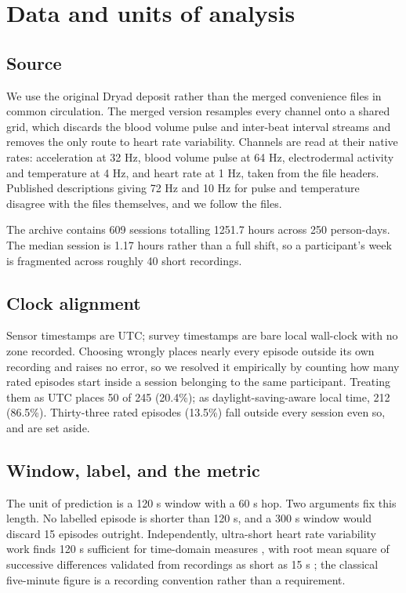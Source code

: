 \documentclass{article}
\begin{document}
\section{Data and units of analysis}
\label{sec:data}

\subsection{Source}

We use the original Dryad deposit rather than the merged convenience files in
common circulation. The merged version resamples every channel onto a shared
grid, which discards the blood volume pulse and inter-beat interval streams and
removes the only route to heart rate variability. Channels are read at their
native rates: acceleration at 32 Hz, blood volume pulse at
64 Hz, electrodermal activity and temperature at 4 Hz, and
heart rate at 1 Hz, taken from the file headers. Published
descriptions giving 72 Hz and 10 Hz for pulse and
temperature disagree with the files themselves, and we follow the files.

The archive contains 609 sessions totalling 1251.7 hours across 250
person-days. The median session is 1.17 hours rather than a full shift,
so a participant's week is fragmented across roughly 40 short recordings.

\subsection{Clock alignment}

Sensor timestamps are UTC; survey timestamps are bare local wall-clock with no
zone recorded. Choosing wrongly places nearly every episode outside its own
recording and raises no error, so we resolved it empirically by counting how
many rated episodes start inside a session belonging to the same participant.
Treating them as UTC places 50 of 245 (20.4\%); as daylight-saving-aware local
time, 212 (86.5\%). Thirty-three rated episodes (13.5\%) fall outside every
session even so, and are set aside.

\subsection{Window, label, and the metric}
\label{sec:metric}

The unit of prediction is a 120 s window with a 60 s
hop. Two arguments fix this length. No labelled episode is shorter than
120 s, and a 300 s window would discard 15 episodes
outright. Independently, ultra-short heart rate variability work finds
120 s sufficient for time-domain measures \cite{munoz2015}, with
root mean square of successive differences validated from recordings as short
as 15 s \cite{orini2023}; the classical five-minute figure is a
recording convention rather than a requirement.
\end{document}
